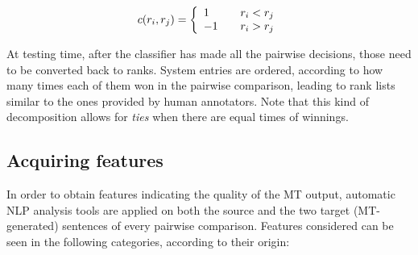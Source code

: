 \documentclass[11pt]{article}
\begin{document}
\[
c(r_i, r_j) = \left\{
  \begin{array}{l l}
    1 & \quad r_i < r_j \\
    -1 & \quad r_i > r_j \\
  \end{array} \right.
\] 

At testing time, after the classifier has made all the pairwise decisions, those
need to be converted back to ranks. System entries are ordered, according to how
many times each of them won in the pairwise comparison, leading to rank lists
similar to the ones provided by human annotators. Note that this kind of
decomposition allows for \textit{ties} when there are equal times of winnings. %


\subsection{Acquiring features\label{features}}
In order to obtain features indicating the quality of the MT output,
automatic NLP analysis tools are applied on both the source and the two target
(MT-generated) sentences of every pairwise comparison. Features
considered can be seen in the following categories, according to their origin:
\end{document}
